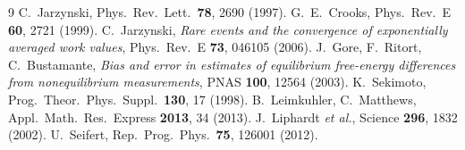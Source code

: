 \documentclass[11pt,a4paper]{article}
\begin{document}
\begin{thebibliography}{9}
 C.~Jarzynski, Phys.\ Rev.\ Lett.\ \textbf{78}, 2690 (1997).
 G.~E.~Crooks, Phys.\ Rev.\ E \textbf{60}, 2721 (1999).
 C.~Jarzynski, \emph{Rare events and the convergence of exponentially averaged
work values}, Phys.\ Rev.\ E \textbf{73}, 046105 (2006).
 J.~Gore, F.~Ritort, C.~Bustamante, \emph{Bias and error in estimates of
equilibrium free-energy differences from nonequilibrium measurements}, PNAS \textbf{100}, 12564 (2003).
 K.~Sekimoto, Prog.\ Theor.\ Phys.\ Suppl.\ \textbf{130}, 17 (1998).
 B.~Leimkuhler, C.~Matthews, Appl.\ Math.\ Res.\ Express \textbf{2013}, 34 (2013).
 J.~Liphardt \emph{et al.}, Science \textbf{296}, 1832 (2002).
 U.~Seifert, Rep.\ Prog.\ Phys.\ \textbf{75}, 126001 (2012).
\end{thebibliography}
\end{document}
